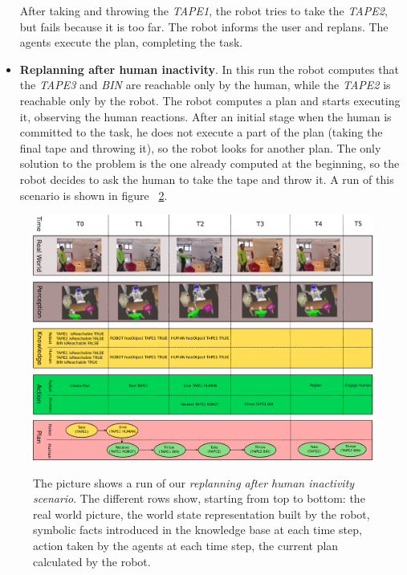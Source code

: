 \begin{itemize}
\begin{figure}
{      }
  \label{fig:coworker_results-scenario3}
\end{figure}


After taking and throwing the \textit{TAPE1}, the robot tries to take the
\textit{TAPE2}, but fails because it is too far. The robot informs the user
and replans. The agents execute the plan, completing the task.

\item
\textbf{Replanning after human inactivity}.
In this run the robot computes that the \textit{TAPE3} and \textit{BIN}
are reachable only by the human, while the \textit{TAPE2} is reachable only by the robot. The robot computes a plan
and starts executing it, observing the human reactions. 
 After an initial stage when the human is
committed to the task, he does not execute a part of the plan (taking
the final tape and throwing it), so the robot looks for another
plan. The only solution to the problem is the one already computed at
the beginning, so the robot decides to ask
 the human to take the tape and throw it. A run of this
scenario is shown in figure ~\ref{fig:coworker_results-experiment}. 
\end{itemize}

 
\begin{figure}
  \caption[Robot coworker experiment 4]{The picture shows a run of our \textit{replanning after human
    inactivity scenario}. The different
    rows show, starting from top to bottom: the real world picture,
    the world state representation built by the robot, symbolic facts
    introduced in the knowledge base at each time step, action taken by the
    agents at each time step, the current plan calculated by the robot.}
  \centering
  \includegraphics[angle=90, scale=0.7]{img/coworker/results/complete_plan.pdf}
  \label{fig:coworker_results-experiment}

\end {figure}


